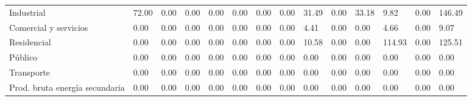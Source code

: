 \documentclass{sener2025}
\begin{document}
\begin{tabladoradoLargo}
\begin{xltabular}{\textwidth}{QZZZZZZZZZZZZZ}
    \hspace{2.7em} Industrial & 72.00 & 0.00 & 0.00 & 0.00 & 0.00 & 0.00 & 0.00 & 31.49 & 0.00 & 33.18 & 9.82 & 0.00 & 146.49 \\
    \hspace{2.7em} Comercial y servicios & 0.00 & 0.00 & 0.00 & 0.00 & 0.00 & 0.00 & 0.00 & 4.41 & 0.00 & 0.00 & 4.66 & 0.00 & 9.07 \\
    \hspace{2.7em} Residencial & 0.00 & 0.00 & 0.00 & 0.00 & 0.00 & 0.00 & 0.00 & 10.58 & 0.00 & 0.00 & 114.93 & 0.00 & 125.51 \\
    \hspace{2.7em} Público & 0.00 & 0.00 & 0.00 & 0.00 & 0.00 & 0.00 & 0.00 & 0.00 & 0.00 & 0.00 & 0.00 & 0.00 & 0.00 \\
    \hspace{2.7em} Transporte & 0.00 & 0.00 & 0.00 & 0.00 & 0.00 & 0.00 & 0.00 & 0.00 & 0.00 & 0.00 & 0.00 & 0.00 & 0.00 \\
    Prod. bruta energía secundaria & 0.00 & 0.00 & 0.00 & 0.00 & 0.00 & 0.00 & 0.00 & 0.00 & 0.00 & 0.00 & 0.00 & 0.00 & 0.00 \\
  \end{xltabular}
\end{tabladoradoLargo}
\vspace{-4pt}
\end{document}
